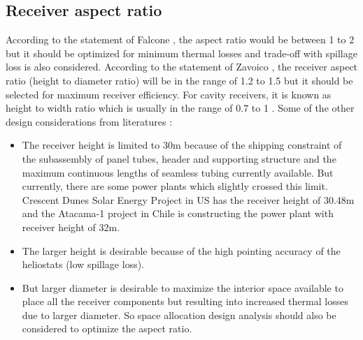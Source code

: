 \subsection{Receiver aspect ratio}
According to the statement of Falcone \cite{Falcone.1986}, the aspect ratio would be between 1 to 2 but it should be optimized for minimum thermal losses and trade-off with spillage loss is also considered. According to the statement of Zavoico \cite{Zavoico.2001}, the receiver aspect ratio (height to diameter ratio) will be in the range of 1.2 to 1.5 but it should be selected for maximum receiver efficiency. For cavity receivers, it is known as height to width ratio which is usually in the range of 0.7 to 1 \cite{Falcone.1986}. Some of the other design considerations from literatures \cite{Falcone.1986} \cite{Zavoico.2001}:
\begin{itemize}
	\item  The receiver height is limited to 30m because of the shipping constraint of the subassembly of panel tubes, header and supporting structure and the maximum continuous lengths of seamless tubing currently available. But currently, there are some power plants which slightly crossed this limit. Crescent Dunes Solar Energy Project in US has the receiver height of 30.48m and the Atacama-1 project in Chile is constructing the power plant with receiver height of 32m. 
	\item The larger height is desirable because of the high pointing accuracy of the heliostats (low spillage loss). 
	\item But larger diameter is desirable to maximize the interior space available to place all the receiver components but resulting into increased thermal losses due to larger diameter. So space allocation design analysis should also be considered to optimize the aspect ratio.
\end{itemize} 
